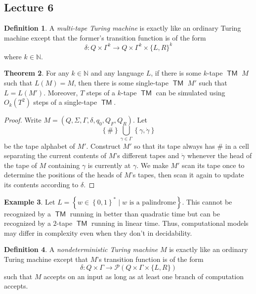 \documentclass[10pt,letterpaper,cm]{nupset}
\theoremstyle{definition}
\newtheorem{definition}{Definition}[subsection]
\newtheorem{exmp}[definition]{Example}
\theoremstyle{theorem}
\newtheorem{theorem}[definition]{Theorem}
\theoremstyle{remark}
\newcommand{\N}{\mathbb N}
\renewcommand{\P}{\mathcal P}
\newcommand{\1}{\mathbf{1}}
\newcommand{\0}{\vec 0}
\DeclareMathOperator{\TM}{\mathsf{TM}}
\begin{document}
\subsection{Lecture 6}

\begin{definition}
A \textit{multi-tape Turing machine} is exactly like an ordinary Turing machine except that the former's transition function is of the form $$ \delta : Q \times \Gamma^k \to Q \times \Gamma^k \times \{L, R\}^k  $$ where $k\in \N$.
\end{definition}

\begin{theorem}\label{equiv}
For any $k\in \N$ and any language $L$, if there is some $k$-tape $\TM$ $M$ such that $L(M) = M$, then there is some single-tape $\TM$ $M'$ such that $L = L(M')$. Moreover, $T$ steps of a $k$-tape $\TM$ can be simulated using $O_k(T^2)$ steps of a single-tape $\TM$.
\end{theorem}
\begin{proof}
Write $M= \left(Q, \Sigma, \Gamma, \delta, q_0, Q_F, Q_R\right)$. Let $$ \left\{\#\right\} \bigcup_{\gamma \in \Gamma} \left\{\gamma, \dot{\gamma} \right\}$$ be the tape alphabet of $M'$. Construct $M'$ so that its tape always has $\#$ in a cell separating  the current contents of $M$'s different tapes and $\dot{\gamma}$ whenever the head of the tape of $M$ containing $\gamma$ is currently at $\gamma$. We make $M'$ scan its tape once to determine the positions of the heads of $M$'s tapes, then scan it again to update its contents according to $\delta$.
\end{proof}

\begin{exmp}
Let $L = \left\{w \in \left\{0,1\right\}^{\ast} \mid w \text{ is a palindrome}\right\}$. This cannot be recognized by a $\TM$ running in better than quadratic time  but can be recognized by a $2$-tape $\TM$ running in linear time.  Thus, computational models may differ in complexity even when they don't in decidability.
\end{exmp}

\begin{definition}
A \textit{nondeterministic Turing machine} $M$ is exactly like an ordinary Turing machine except that $M$'s transition function is of the form $$ \delta : Q \times \Gamma \to \P(Q \times \Gamma \times \{L, R\})  $$ such that $M$ accepts on an input as long as at least one branch of computation accepts.
\end{definition}
\end{document}
